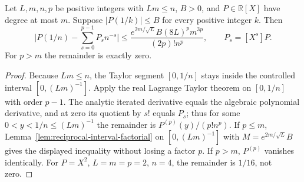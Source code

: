 \begin{lemma}
\label{lem:reciprocal-taylor-remainder}
\leanok
{}
Let $L,m,n,p$ be positive integers with $Lm\le n$, $B>0$, and
$P\in\mathbb R[X]$ have degree at most $m$. Suppose
$|P(1/k)|\le B$ for every positive integer $k$. Then
\[
 \bigl|P(1/n)-\sum_{s=0}^{p-1}P_s n^{-s}\bigr|
 \le \frac{e^{2m/\sqrt L} B(8L)^p m^{3p}}{(2p)!n^p},
 \qquad P_s=[X^s]P.
\]
For $p>m$ the remainder is exactly zero.
\end{lemma}
\begin{proof}
Because $Lm \le n$, the Taylor segment $[0, 1/n]$ stays inside the controlled interval $[0, (Lm)^{-1}]$. Apply the real Lagrange Taylor theorem on $[0,1/n]$ with order $p-1$.
The analytic iterated derivative equals the algebraic polynomial derivative, and at zero its quotient by $s!$ equals $P_s$; thus for some $0<y<1/n \le (Lm)^{-1}$ the remainder is $P^{(p)}(y)/(p!n^p)$.
If $p\le m$, Lemma~\ref{lem:reciprocal-interval-factorial} on $[0, (Lm)^{-1}]$ with $M = e^{2m/\sqrt{L}} B$ gives the displayed inequality without losing a factor $p$.
If $p>m$, $P^{(p)}$ vanishes identically. For $P=X^2$, $L=m=p=2$, $n=4$,
the remainder is $1/16$, not zero.
\end{proof}

